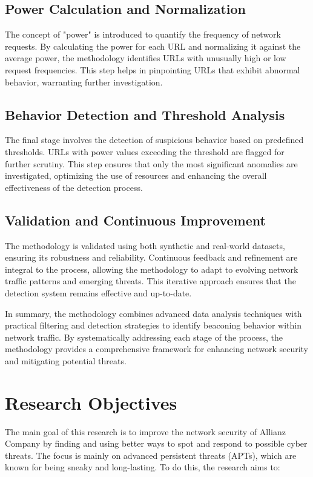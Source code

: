 \subsection{Power Calculation and Normalization}
The concept of "power" is introduced to quantify the frequency of network requests. By calculating the power for each URL and normalizing it against the average power, the methodology identifies URLs with unusually high or low request frequencies. This step helps in pinpointing URLs that exhibit abnormal behavior, warranting further investigation.

\subsection{Behavior Detection and Threshold Analysis}
The final stage involves the detection of suspicious behavior based on predefined thresholds. URLs with power values exceeding the threshold are flagged for further scrutiny. This step ensures that only the most significant anomalies are investigated, optimizing the use of resources and enhancing the overall effectiveness of the detection process.

\subsection{Validation and Continuous Improvement}
The methodology is validated using both synthetic and real-world datasets, ensuring its robustness and reliability. Continuous feedback and refinement are integral to the process, allowing the methodology to adapt to evolving network traffic patterns and emerging threats. This iterative approach ensures that the detection system remains effective and up-to-date.

In summary, the methodology combines advanced data analysis techniques with practical filtering and detection strategies to identify beaconing behavior within network traffic. By systematically addressing each stage of the process, the methodology provides a comprehensive framework for enhancing network security and mitigating potential threats.

\section{Research Objectives}
The main goal of this research is to improve the network security of Allianz Company by finding and using better ways to spot and respond to possible cyber threats. The focus is mainly on advanced persistent threats (APTs), which are known for being sneaky and long-lasting. To do this, the research aims to:

